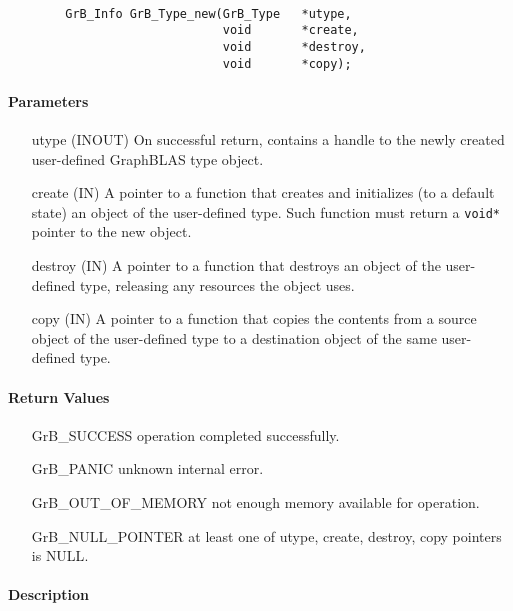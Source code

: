 \paragraph{\syntax}

\begin{verbatim}
        GrB_Info GrB_Type_new(GrB_Type   *utype,
                              void       *create,
                              void       *destroy,
                              void       *copy);
\end{verbatim}

\paragraph{Parameters}

\begin{itemize}[leftmargin=1.1in]
\item[{\sf utype}] ({\sf INOUT}) On successful return, contains a handle to the newly created user-defined GraphBLAS type object.
\item[{\sf create}] ({\sf IN})    A pointer to a function that creates and initializes (to a default state) an object of the user-defined type. Such function must return a {\tt void*} pointer to the new object.
\item[{\sf destroy}] ({\sf IN}) A pointer to a function that destroys an object of the user-defined type, releasing any resources the object uses.
\item[{\sf copy}] ({\sf IN}) A pointer to a function that copies the contents from a source object of the user-defined type to a destination object of the same user-defined type.
\end{itemize}

\paragraph{Return Values}

\begin{itemize}[leftmargin=2.1in]
\item[{\sf GrB\_SUCCESS}]           operation completed successfully.
\item[{\sf GrB\_PANIC}]             unknown internal error.
\item[{\sf GrB\_OUT\_OF\_MEMORY}]          not enough memory available for operation.
\item[{\sf GrB\_NULL\_POINTER}]    at least one of {\sf utype}, {\sf create}, {\sf destroy}, {\sf copy} pointers is {\sf NULL}.
\end{itemize}

\paragraph{Description}
